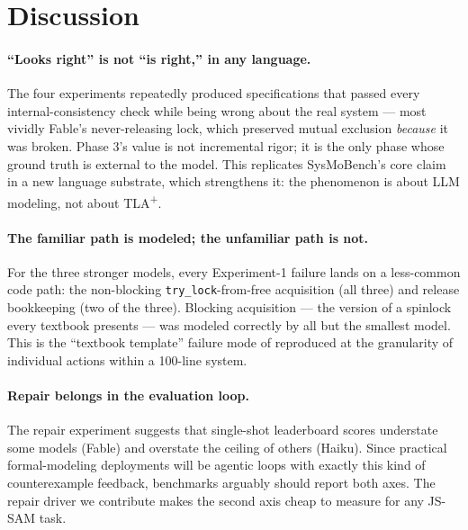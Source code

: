 \documentclass[11pt]{article}
\newcommand{\jssam}{JS-SAM}
\newcommand{\tlaplus}{TLA\texorpdfstring{\textsuperscript{+}}{+}}
\begin{document}
\section{Discussion}
\label{sec:discussion}

\paragraph{``Looks right'' is not ``is right,'' in any language.}
The four experiments repeatedly produced specifications that passed every
internal-consistency check while being wrong about the real system --- most
vividly Fable's never-releasing lock, which preserved mutual exclusion
\emph{because} it was broken. Phase 3's value is not incremental rigor; it is
the only phase whose ground truth is external to the model. This replicates
SysMoBench's core claim~\cite{sysmobench,sigops2026} in a new language
substrate, which strengthens it: the phenomenon is about LLM modeling, not
about \tlaplus{}.

\paragraph{The familiar path is modeled; the unfamiliar path is not.}
For the three stronger models, every Experiment-1 failure lands on a
less-common code path: the non-blocking \texttt{try\_lock}-from-free
acquisition (all three) and release bookkeeping (two of the three).
Blocking acquisition --- the version of a spinlock every textbook
presents --- was modeled correctly by all but the smallest model. This is
the ``textbook template'' failure mode of \cite{sigops2026} reproduced at
the granularity of individual actions within a 100-line system.

\paragraph{Repair belongs in the evaluation loop.}
The repair experiment suggests that single-shot leaderboard scores understate
some models (Fable) and overstate the ceiling of others (Haiku). Since
practical formal-modeling deployments will be agentic loops with exactly this
kind of counterexample feedback, benchmarks arguably should report both axes.
The repair driver we contribute makes the second axis cheap to measure for
any \jssam{} task.
\end{document}
